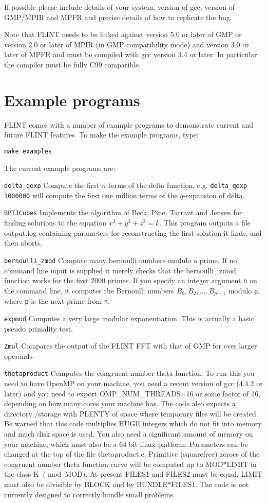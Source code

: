 \documentclass[a4paper,10pt]{article}
\newcommand{\code}{\lstinline}
\begin{document}
If possible please include details of your system, version of gcc, version of GMP/MPIR and MPFR and precise 
details of how to replicate the bug.

Note that FLINT needs to be linked against version 5.0 or later of GMP or version 2.0 or later of MPIR 
(in GMP compatibility mode) and version 3.0 or later of MPFR and must be compiled with gcc version 3.4 
or later. In particular the compiler must be fully C99 compatible.

\section{Example programs}

FLINT comes with a number of example programs to demonstrate current and future FLINT features. To make the
example programs, type:

\code{make examples}

The current example programs are:

\code{delta_qexp} Compute the first $n$ terms of the delta function, e.g. \code{delta_qexp 1000000} 
will compute the first one million terms of the $q$-expansion of delta.

\code{BPTJCubes} Implements the algorithm of Beck, Pine, Tarrant and Jensen for finding solutions to 
the equation $x^3+y^3+z^3 = k$. This program outputs a file output.log containing parameters for
reconstructing the first solution it finds, and then aborts.

\code{bernoulli_zmod} Compute many bernoulli numbers modulo a prime. If no command line input is 
supplied it merely checks that the bernoulli\_zmod function works for the first 2000 primes. If 
you specify an integer argument \code{n} on the command line, it computes the Bernoulli numbers 
$B_0, B_2, ..., B_{p-1}$ modulo \code{p}, where \code{p} is the next prime from \code{n}.

\code{expmod} Computes a very large modular exponentiation. This is actually a basic pseudo primality test.

\code{Zmul} Compares the output of the FLINT FFT with that of GMP for ever larger operands.

\code{thetaproduct} Computes the congruent number theta function. To run this you need to have OpenMP 
on your machine, you need a recent version of gcc (4.4.2 or later) and you need to export 
OMP\_NUM\_THREADS=16 or some factor of 16, depending on how many cores your machine has. The code also 
expects a directory /storage with PLENTY of space where temporary files will be created. Be warned that 
this code multiplies HUGE integers which do not fit into memory and much disk space is used. You also 
need a significant amount of memory on your machine, which must also be a 64 bit linux platform. 
Parameters can be changed at the top of the file thetaproduct.c. Primitive (squarefree) zeroes of the 
congruent number theta function curve will be computed up to MOD$*$LIMIT in the class K $\pmod{\mbox{MOD}}$. 
At present FILES1 and FILES2 must be equal. LIMIT must also be divisible by BLOCK and by BUNDLE$*$FILES1. 
The code is not currently designed to correctly handle small problems.  
\end{document}
